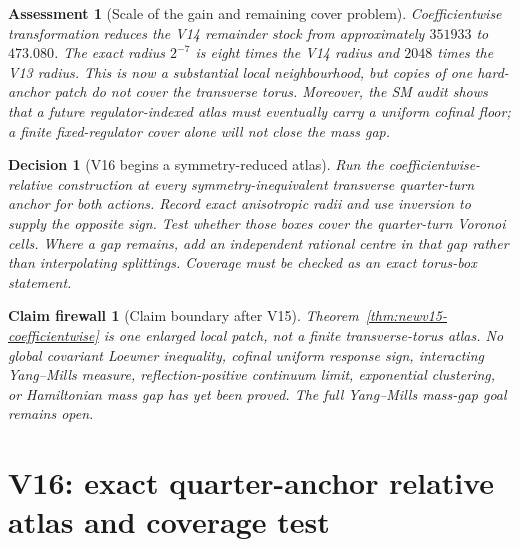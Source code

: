 \documentclass[11pt,oneside]{article}
\newtheorem{assessment}[theorem]{Assessment}
\newtheorem{firewall}[theorem]{Claim firewall}
\newtheorem{decision}[theorem]{Decision}
\theoremstyle{definition}
\theoremstyle{remark}
\begin{document}
\begin{assessment}[Scale of the gain and remaining cover problem]
\label{ass:newv15}
Coefficientwise transformation reduces the V14 remainder stock from
approximately \(351933\) to \(473.080\).  The exact radius \(2^{-7}\)
is eight times the V14 radius and \(2048\) times the V13 radius.
This is now a substantial local neighbourhood, but copies of one
hard-anchor patch do not cover the transverse torus.  Moreover, the
SM audit shows that a future regulator-indexed atlas must eventually
carry a uniform cofinal floor; a finite fixed-regulator cover alone
will not close the mass gap.
\end{assessment}

\begin{decision}[V16 begins a symmetry-reduced atlas]
\label{dec:newv15-next}
Run the coefficientwise-relative construction at every
symmetry-inequivalent transverse quarter-turn anchor for both
actions.  Record exact anisotropic radii and use inversion to supply
the opposite sign.  Test whether those boxes cover the quarter-turn
Voronoi cells.  Where a gap remains, add an independent rational
centre in that gap rather than interpolating splittings.  Coverage
must be checked as an exact torus-box statement.
\end{decision}

\begin{firewall}[Claim boundary after V15]
\label{fire:newv15-final}
Theorem~\ref{thm:newv15-coefficientwise} is one enlarged local patch,
not a finite transverse-torus atlas.  No global covariant Loewner
inequality, cofinal uniform response sign, interacting Yang--Mills
measure, reflection-positive continuum limit, exponential
clustering, or Hamiltonian mass gap has yet been proved.  The full
Yang--Mills mass-gap goal remains open.
\end{firewall}

\section{V16: exact quarter-anchor relative atlas and coverage test}
\label{sec:newv16-atlas}
\end{document}
